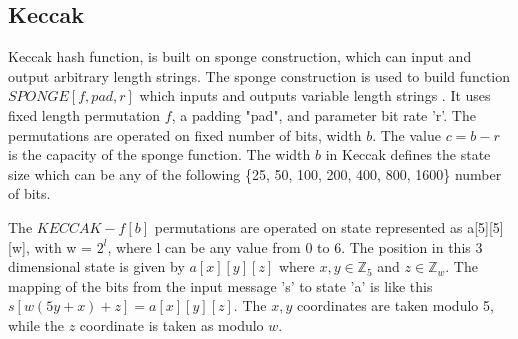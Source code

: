 \documentclass[12pt]{artikel3}                  %
\begin{document}
\subsection{Keccak}
Keccak hash function, is built on sponge construction, which can input and output arbitrary length strings. The sponge 
construction is used to build function $SPONGE[f, pad, r]$ which inputs and outputs variable length strings \cite{00016}. 
It uses fixed length permutation $f$, a padding "pad", and parameter bit rate 'r'. The permutations are operated on
fixed number of bits, width $b$. The value $c = b - r$ is the capacity of the sponge function. The width $b$ in Keccak
defines the state size which can be any of the following \{25, 50, 100, 200, 400, 800, 1600\} number of bits.

The $KECCAK-f[b]$ permutations are operated on state represented as a[5][5][w], with w = $2^{l}$, where l can be any value
from 0 to 6. The position in this 3 dimensional state is given by $a[x][y][z]$ where $x, y \in \mathbb{Z}_{5}$ and $z \in 
\mathbb{Z}_{w}$. The mapping of the bits from the input message 's' to state 'a' is like this $s[w (5y + x) + z] = a[x][y][z]$.
The $x, y$ coordinates are taken modulo 5, while the $z$ coordinate is taken as modulo $w$.  \cite{00015}
\end{document}

